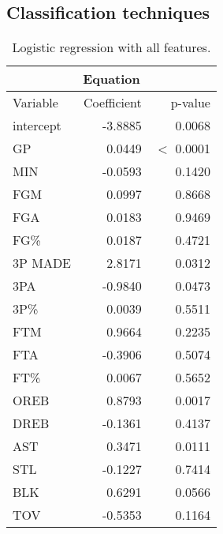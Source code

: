 \subsection*{Classification techniques}\label{appendix:ct}

\begin{table}[h]
	\centering
	\begin{tabular}{|| l | r | r ||} 
		\hline
		\multicolumn{3}{|c|}{Equation} \\
		\hline
		Variable & Coefficient & p-value \\
		\hline
		intercept & -3.8885 & 0.0068 \\
		GP & 0.0449 & $<$ 0.0001 \\
		MIN & -0.0593 & 0.1420 \\
		FGM & 0.0997 & 0.8668 \\
		FGA & 0.0183 & 0.9469 \\
		FG\% & 0.0187 & 0.4721 \\
		3P MADE & 2.8171 & 0.0312 \\
		3PA & -0.9840 & 0.0473 \\
		3P\% & 0.0039 & 0.5511 \\
		FTM & 0.9664 & 0.2235 \\
		FTA & -0.3906 & 0.5074 \\
		FT\% & 0.0067 & 0.5652 \\
		OREB & 0.8793 & 0.0017 \\
		DREB & -0.1361 & 0.4137 \\
		AST & 0.3471 & 0.0111 \\
		STL & -0.1227 & 0.7414 \\
		BLK & 0.6291 & 0.0566 \\				
		TOV & -0.5353 & 0.1164 \\		
		\hline
	\end{tabular}
	\caption{Logistic regression with all features.}
	\label{table:LRAllSum}
\end{table}

